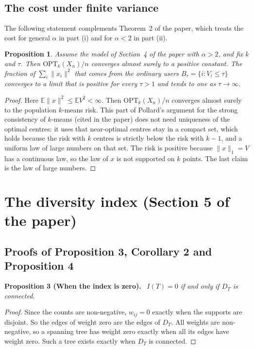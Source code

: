 \documentclass[11pt]{article}
\newcommand{\norm}[1]{\lVert #1 \rVert}
\newenvironment{result}[1]{\par\medskip\noindent\textbf{#1.}\ \itshape}{\par\smallskip}
\newtheorem{proposition}{Proposition}\renewcommand{\theproposition}{S\arabic{proposition}}
\theoremstyle{remark}\newtheorem{remark}{Remark}\renewcommand{\theremark}{S\arabic{remark}}
\newcommand{\opt}{\mathrm{OPT}}
\begin{document}
\subsection*{The cost under finite variance}
The following statement complements Theorem~2 of the paper, which treats the cost for general $\alpha$ in part (i) and for $\alpha<2$ in part (ii).
\begin{proposition}\label{prop:finite}
Assume the model of Section~4 of the paper with $\alpha>2$, and fix $k$ and $\tau$. Then $\opt_k(X_n)/n$ converges almost surely to a positive constant. The fraction of $\sum_i\norm{x_i}^2$ that comes from the ordinary users $B_\tau=\{i:V_i\le\tau\}$ converges to a limit that is positive for every $\tau>1$ and tends to one as $\tau\to\infty$.
\end{proposition}
\begin{proof}
Here $\mathbb{E}\norm{x}^2\le\mathbb{E}V^2<\infty$. Then $\opt_k(X_n)/n$ converges almost surely to the population $k$-means risk. This part of Pollard's argument for the strong consistency of $k$-means (cited in the paper) does not need uniqueness of the optimal centres: it uses that near-optimal centres stay in a compact set, which holds because the risk with $k$ centres is strictly below the risk with $k-1$, and a uniform law of large numbers on that set. The risk is positive because $\norm{x}_1=V$ has a continuous law, so the law of $x$ is not supported on $k$ points. The last claim is the law of large numbers.
\end{proof}

\section{The diversity index (Section 5 of the paper)}\label{s:index}

\subsection*{Proofs of Proposition 3, Corollary 2 and Proposition 4}
\begin{result}{Proposition 3 (When the index is zero)}
$I(T)=0$ if and only if $D_T$ is connected.
\end{result}
\begin{proof}
Since the counts are non-negative, $w_{ij}=0$ exactly when the supports are disjoint. So the edges of weight zero are the edges of $D_T$. All weights are non-negative, so a spanning tree has weight zero exactly when all its edges have weight zero. Such a tree exists exactly when $D_T$ is connected.
\end{proof}
\end{document}
